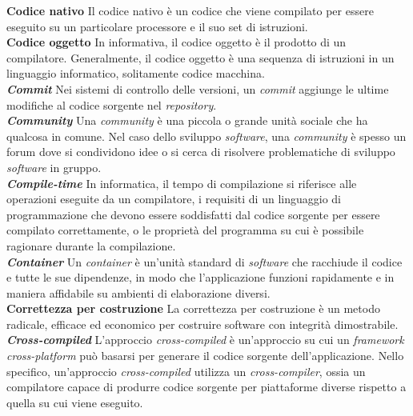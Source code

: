 \textbf{Codice nativo} Il codice nativo è un codice che viene compilato per essere eseguito su un particolare processore e il suo set di istruzioni.\\

\textbf{Codice oggetto} In informativa, il codice oggetto è il prodotto di un compilatore. Generalmente, il codice oggetto è una sequenza di istruzioni in un linguaggio informatico, solitamente codice macchina.\\

\textbf{\textit{Commit}} Nei sistemi di controllo delle versioni, un \textit{commit} aggiunge le ultime modifiche al codice sorgente nel \textit{repository}.\\

\textbf{\textit{Community}} Una \textit{community} è una piccola o grande unità sociale che ha qualcosa in comune. Nel caso dello sviluppo \textit{software}, una \textit{community} è spesso un forum dove si condividono idee o si cerca di risolvere problematiche di sviluppo \textit{software} in gruppo.\\

\textbf{\textit{Compile-time}} In informatica, il tempo di compilazione si riferisce alle operazioni eseguite da un compilatore, i requisiti di un linguaggio di programmazione che devono essere soddisfatti dal codice sorgente per essere compilato correttamente, o le proprietà del programma su cui è possibile ragionare durante la compilazione.\\

\textbf{\textit{Container}} Un \textit{container} è un'unità standard di \textit{software} che racchiude il codice e tutte le sue dipendenze, in modo che l'applicazione funzioni rapidamente e in maniera affidabile su ambienti di elaborazione diversi.\\

\textbf{Correttezza per costruzione} La correttezza per costruzione è un metodo radicale, efficace ed economico per costruire software con integrità dimostrabile.\\

\textbf{\textit{Cross-compiled}} L'approccio \textit{cross-compiled} è un'approccio su cui un \textit{framework cross-platform} può basarsi per generare il codice sorgente dell'applicazione. Nello specifico, un'approccio \textit{cross-compiled} utilizza un \textit{cross-compiler}, ossia un compilatore capace di produrre codice sorgente per piattaforme diverse rispetto a quella su cui viene eseguito.\\

